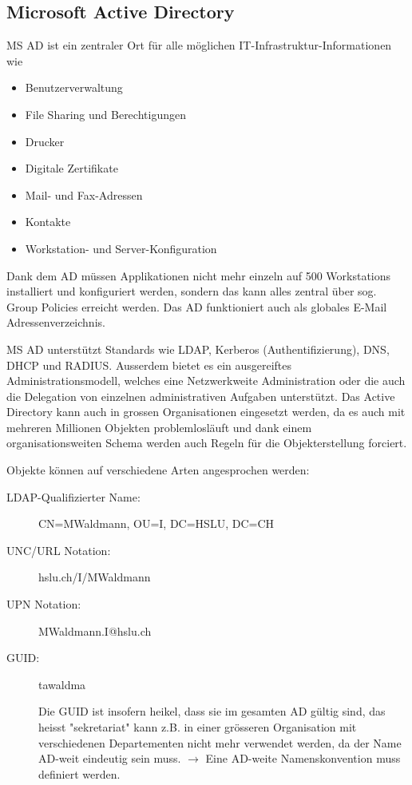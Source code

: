 \documentclass[a4paper, 11pt]{article}
\begin{document}
\subsection{Microsoft Active Directory}
MS AD ist ein zentraler Ort für alle möglichen IT-Infrastruktur-Informationen wie
\begin{itemize}
	\item Benutzerverwaltung
	\item File Sharing und Berechtigungen
	\item Drucker
	\item Digitale Zertifikate
	\item Mail- und Fax-Adressen
	\item Kontakte
	\item Workstation- und Server-Konfiguration
\end{itemize}

Dank dem AD müssen Applikationen nicht mehr einzeln auf 500 Workstations installiert und konfiguriert werden, sondern das kann alles zentral über sog. Group Policies erreicht werden. Das AD funktioniert auch als globales E-Mail Adressenverzeichnis.

\newpage

\noindent MS AD unterstützt Standards wie LDAP, Kerberos (Authentifizierung), DNS, DHCP und RADIUS. Ausserdem bietet es ein ausgereiftes Administrationsmodell, welches eine Netzwerkweite Administration oder die auch die Delegation von einzelnen administrativen Aufgaben unterstützt. Das Active Directory kann auch in grossen Organisationen eingesetzt werden, da es auch mit mehreren Millionen Objekten problemlosläuft und dank einem organisationsweiten Schema werden auch Regeln für die Objekterstellung forciert.

\vspace{10px}

\noindent Objekte können auf verschiedene Arten angesprochen werden: 

\begin{description}
	\item[LDAP-Qualifizierter Name: ] CN=MWaldmann, OU=I, DC=HSLU, DC=CH
	\item[UNC/URL Notation: ] hslu.ch/I/MWaldmann
	\item[UPN Notation: ] MWaldmann.I@hslu.ch
	\item[GUID: ] tawaldma
	
	Die GUID ist insofern heikel, dass sie im gesamten AD gültig sind, das heisst "sekretariat" kann z.B. in einer grösseren Organisation mit verschiedenen Departementen nicht mehr verwendet werden, da der Name AD-weit eindeutig sein muss. $\rightarrow$ Eine AD-weite Namenskonvention muss definiert werden.
\end{description}
\end{document}
